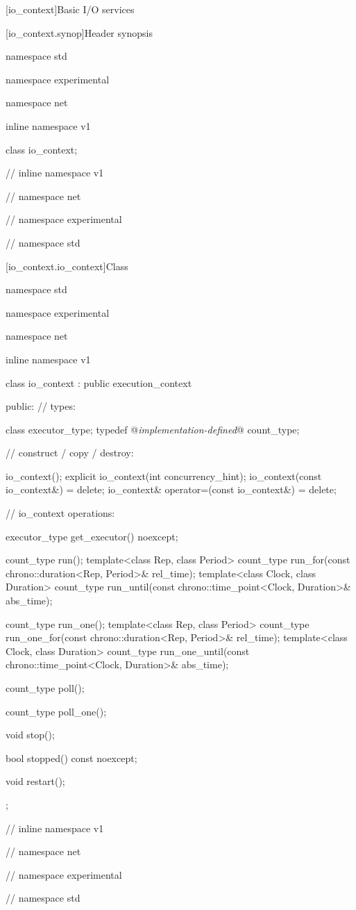 
[io_context]{Basic I/O services}


%
[io_context.synop]{Header  synopsis}

\begin{codeblock}
namespace std {
namespace experimental {
namespace net {
inline namespace v1 {

  class io_context;

} // inline namespace v1
} // namespace net
} // namespace experimental
} // namespace std
\end{codeblock}



[io_context.io_context]{Class }

%
\begin{codeblock}
namespace std {
namespace experimental {
namespace net {
inline namespace v1 {

  class io_context : public execution_context
  {
  public:
    // types:

    class executor_type;
    typedef @\textit{implementation-defined}@ count_type;

    // construct / copy / destroy:

    io_context();
    explicit io_context(int concurrency_hint);
    io_context(const io_context&) = delete;
    io_context& operator=(const io_context&) = delete;

    // io_context operations:

    executor_type get_executor() noexcept;

    count_type run();
    template<class Rep, class Period>
      count_type run_for(const chrono::duration<Rep, Period>& rel_time);
    template<class Clock, class Duration>
      count_type run_until(const chrono::time_point<Clock, Duration>& abs_time);

    count_type run_one();
    template<class Rep, class Period>
      count_type run_one_for(const chrono::duration<Rep, Period>& rel_time);
    template<class Clock, class Duration>
      count_type run_one_until(const chrono::time_point<Clock, Duration>& abs_time);

    count_type poll();

    count_type poll_one();

    void stop();

    bool stopped() const noexcept;

    void restart();
  };

} // inline namespace v1
} // namespace net
} // namespace experimental
} // namespace std
\end{codeblock}

